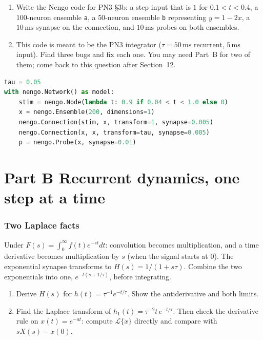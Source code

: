 \documentclass[11pt,letterpaper]{article}
\begin{document}
\begin{enumerate}
\item Write the Nengo code for PN3 \S3b: a step input that is $1$ for $0.1 < t < 0.4$, a $100$-neuron ensemble \texttt{a}, a $50$-neuron ensemble \texttt{b} representing $y = 1 - 2x$, a $10\,\mathrm{ms}$ synapse on the connection, and $10\,\mathrm{ms}$ probes on both ensembles.
\item This code is meant to be the PN3 integrator ($\tau = 50\,\mathrm{ms}$ recurrent, $5\,\mathrm{ms}$ input). Find three bugs and fix each one. You may need Part~B for two of them; come back to this question after Section~12.
\end{enumerate}
\begin{lstlisting}[language=Python]
tau = 0.05
with nengo.Network() as model:
    stim = nengo.Node(lambda t: 0.9 if 0.04 < t < 1.0 else 0)
    x = nengo.Ensemble(200, dimensions=1)
    nengo.Connection(stim, x, transform=1, synapse=0.005)
    nengo.Connection(x, x, transform=tau, synapse=0.005)
    p = nengo.Probe(x, synapse=0.01)
\end{lstlisting}

\part*{Part B \quad Recurrent dynamics, one step at a time}

\section{Two Laplace facts}

\begin{idea}
Under $F(s) = \int_0^\infty f(t)e^{-st}dt$: convolution becomes multiplication, and a time derivative becomes multiplication by $s$ (when the signal starts at $0$). The exponential synapse transforms to $H(s) = 1/(1 + s\tau)$. Combine the two exponentials into one, $e^{-t(s + 1/\tau)}$, before integrating.
\end{idea}

\begin{enumerate}
\item Derive $H(s)$ for $h(t) = \tau^{-1}e^{-t/\tau}$. Show the antiderivative and both limits.
\item Find the Laplace transform of $h_1(t) = \tau^{-2}t\,e^{-t/\tau}$. Then check the derivative rule on $x(t) = e^{-at}$: compute $\mathcal{L}\{\dot x\}$ directly and compare with $sX(s) - x(0)$.
\end{enumerate}
\end{document}
